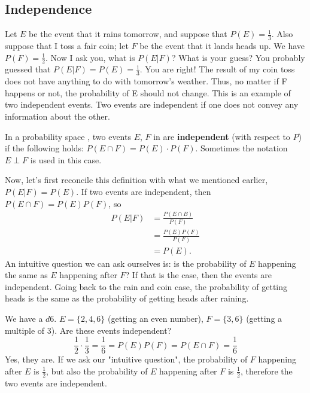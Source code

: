 \subsection{Independence}
Let $E$ be the event that it rains tomorrow, and suppose that $P(E)=\frac{1}{3}$. Also suppose that I toss a fair coin; let $F$ be the event that it lands heads up. We have $P(F)=\frac{1}{2}$. Now I ask you, what is $P(E|F)$? What is your guess? You probably guessed that $P(E|F)=P(E)=\frac{1}{3}$. You are right! The result of my coin toss does not have anything to do with tomorrow's weather. Thus, no matter if F happens or not, the probability of E should not change. This is an example of two independent events. Two events are independent if one does not convey any information about the other.
\begin{definition}
    In a probability space \probspace{}, two events $E$, $F$ in \eff{} are \textbf{independent} (with respect to $P$) if the following holds: $P(E \cap F) = P(E) \cdot P(F)$. Sometimes the notation $E \perp F$ is used in this case.
\end{definition}
Now, let's first reconcile this definition with what we mentioned earlier, $P(E|F)=P(E)$. If two events are independent, then $P(E \cap F)=P(E)P(F)$, so
\begin{equation*}
    \begin{split}
    P(E|F) & = \frac{P(E \cap B)}{P(F)} \\
    & = \frac{P(E)P(F)}{P(F)} \\
    & = P(E).
\end{split}
\end{equation*}
An intuitive question we can ask ourselves is: is the probability of $E$ happening the same as $E$ happening after $F$? If that is the case, then the events are independent. Going back to the rain and coin case, the probability of getting heads is the same as the probability of getting heads after raining.
\begin{example}
    We have a $d6$. $E = \{2,4,6\}$ (getting an even number), $F = \{3, 6\}$ (getting a multiple of 3). Are these events independent?
    \begin{equation*}
        \frac{1}{2}\cdot\frac{1}{3} = \frac{1}{6} = P(E)P(F) = P(E \cap F) = \frac{1}{6}
    \end{equation*}
    Yes, they are. If we ask our "intuitive question", the probability of $F$ happening after $E$ is $\frac{1}{2}$, but also the probability of $E$ happening after $F$ is $\frac{1}{2}$, therefore the two events are independent.
\end{example}
